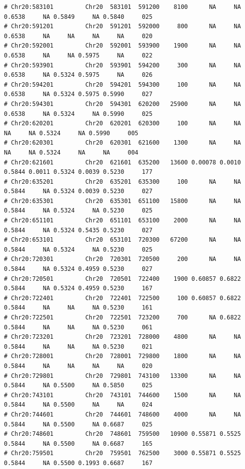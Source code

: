 \documentclass{article}\usepackage[]{graphicx}\usepackage[]{color}
\makeatletter
\newenvironment{kframe}{%
 \def\at@end@of@kframe{}%
 \ifinner\ifhmode%
  \def\at@end@of@kframe{\end{minipage}}%
  \begin{minipage}{\columnwidth}%
 \fi\fi%
 \def\FrameCommand##1{\hskip\@totalleftmargin \hskip-\fboxsep
 \colorbox{shadecolor}{##1}\hskip-\fboxsep
     \hskip-\linewidth \hskip-\@totalleftmargin \hskip\columnwidth}%
 \MakeFramed {\advance\hsize-\width
   \@totalleftmargin\z@ \linewidth\hsize
   \@setminipage}}%
 {\par\unskip\endMakeFramed%
 \at@end@of@kframe}
\newenvironment{knitrout}{}{} %
\makeatother
\begin{document}
\begin{knitrout}
\begin{kframe}
\begin{verbatim}
# Chr20:583101         Chr20  583101  591200    8100      NA     NA 0.6538     NA 0.5849     NA 0.5840     025
# Chr20:591201         Chr20  591201  592000     800      NA     NA 0.6538     NA     NA     NA     NA     020
# Chr20:592001         Chr20  592001  593900    1900      NA     NA 0.6538     NA     NA 0.5975     NA     022
# Chr20:593901         Chr20  593901  594200     300      NA     NA 0.6538     NA 0.5324 0.5975     NA     026
# Chr20:594201         Chr20  594201  594300     100      NA     NA 0.6538     NA 0.5324 0.5975 0.5990     027
# Chr20:594301         Chr20  594301  620200   25900      NA     NA 0.6538     NA 0.5324     NA 0.5990     025
# Chr20:620201         Chr20  620201  620300     100      NA     NA     NA     NA 0.5324     NA 0.5990     005
# Chr20:620301         Chr20  620301  621600    1300      NA     NA     NA     NA 0.5324     NA     NA     004
# Chr20:621601         Chr20  621601  635200   13600 0.00078 0.0010 0.5844 0.0011 0.5324 0.0039 0.5230     177
# Chr20:635201         Chr20  635201  635300     100      NA     NA 0.5844     NA 0.5324 0.0039 0.5230     027
# Chr20:635301         Chr20  635301  651100   15800      NA     NA 0.5844     NA 0.5324     NA 0.5230     025
# Chr20:651101         Chr20  651101  653100    2000      NA     NA 0.5844     NA 0.5324 0.5435 0.5230     027
# Chr20:653101         Chr20  653101  720300   67200      NA     NA 0.5844     NA 0.5324     NA 0.5230     025
# Chr20:720301         Chr20  720301  720500     200      NA     NA 0.5844     NA 0.5324 0.4959 0.5230     027
# Chr20:720501         Chr20  720501  722400    1900 0.60857 0.6822 0.5844     NA 0.5324 0.4959 0.5230     167
# Chr20:722401         Chr20  722401  722500     100 0.60857 0.6822 0.5844     NA     NA     NA 0.5230     161
# Chr20:722501         Chr20  722501  723200     700      NA 0.6822 0.5844     NA     NA     NA 0.5230     061
# Chr20:723201         Chr20  723201  728000    4800      NA     NA 0.5844     NA     NA     NA 0.5230     021
# Chr20:728001         Chr20  728001  729800    1800      NA     NA 0.5844     NA     NA     NA     NA     020
# Chr20:729801         Chr20  729801  743100   13300      NA     NA 0.5844     NA 0.5500     NA 0.5850     025
# Chr20:743101         Chr20  743101  744600    1500      NA     NA 0.5844     NA 0.5500     NA     NA     024
# Chr20:744601         Chr20  744601  748600    4000      NA     NA 0.5844     NA 0.5500     NA 0.6687     025
# Chr20:748601         Chr20  748601  759500   10900 0.55871 0.5525 0.5844     NA 0.5500     NA 0.6687     165
# Chr20:759501         Chr20  759501  762500    3000 0.55871 0.5525 0.5844     NA 0.5500 0.1993 0.6687     167

\end{verbatim}
\end{kframe}
\end{knitrout}
\end{document}

